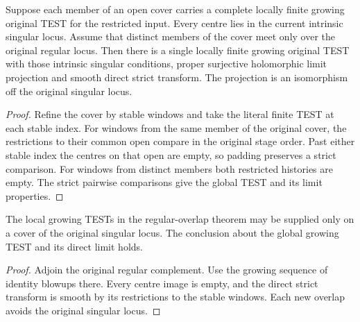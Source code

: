 \begin{theorem}
\label{hir:g8-regular-overlap-growing-test-limit}
\leanok
Suppose each member of an open cover carries a complete locally
finite growing original TEST for the restricted input. Every centre
lies in the current intrinsic singular locus. Assume that distinct
members of the cover meet only over the original regular locus.
Then there is a single locally finite growing original TEST with those
intrinsic singular conditions, proper surjective holomorphic limit
projection and smooth direct strict transform. The projection is
an isomorphism off the original singular locus.
\end{theorem}
\begin{proof}
Refine the cover by stable windows and take the literal finite TEST
at each stable index. For windows from the same member of the
original cover, the restrictions to their common open compare in the
original stage order. Past either stable index the centres on that
open are empty, so padding preserves a strict comparison. For
windows from distinct members both restricted histories are empty.
The strict pairwise comparisons give the global TEST and its limit
properties.
\end{proof}

\begin{corollary}
\label{hir:g8-growing-singular-cover-test-limit}
\leanok
The local growing TESTs in the regular-overlap theorem may be
supplied only on a cover of the original singular locus. The
conclusion about the global growing TEST and its direct limit holds.
\end{corollary}
\begin{proof}
Adjoin the original regular complement. Use the growing sequence
of identity blowups there. Every centre image is empty, and the
direct strict transform is smooth by its restrictions to the stable
windows. Each new overlap avoids the original singular locus.
\end{proof}

